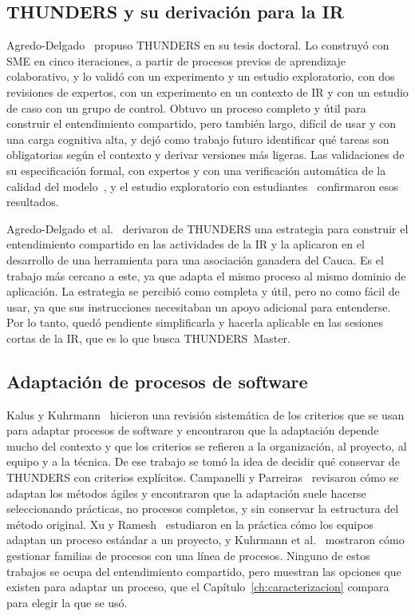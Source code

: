 \documentclass[12pt,letterpaper,oneside]{report}
\begin{document}
\subsection{THUNDERS y su derivación para la IR}
Agredo-Delgado~\cite{agredo2022thesis} propuso THUNDERS en su tesis doctoral. Lo
construyó con SME en cinco iteraciones, a partir de procesos previos de
aprendizaje colaborativo, y lo validó con un experimento y un estudio
exploratorio, con dos revisiones de expertos, con un experimento en un contexto
de IR y con un estudio de caso con un grupo de control. Obtuvo un proceso
completo y útil para construir el entendimiento compartido, pero también largo,
difícil de usar y con una carga cognitiva alta, y dejó como trabajo futuro
identificar qué tareas son obligatorias según el contexto y derivar versiones
más ligeras. Las validaciones de su especificación formal, con expertos y con
una verificación automática de la calidad del modelo~\cite{agredo2023validating},
y el estudio exploratorio con estudiantes~\cite{agredo2022exploratory}
confirmaron esos resultados.

Agredo-Delgado et al.~\cite{agredo2023strategy} derivaron de THUNDERS una
estrategia para construir el entendimiento compartido en las actividades de la
IR y la aplicaron en el desarrollo de una herramienta para una asociación
ganadera del Cauca. Es el trabajo más cercano a este, ya que adapta el mismo
proceso al mismo dominio de aplicación. La estrategia se percibió como completa
y útil, pero no como fácil de usar, ya que sus instrucciones necesitaban un apoyo
adicional para entenderse. Por lo tanto, quedó pendiente simplificarla y hacerla
aplicable en las sesiones cortas de la IR, que es lo que busca THUNDERS~Master.

\subsection{Adaptación de procesos de software}
Kalus y Kuhrmann~\cite{kalus2013tailoring} hicieron una revisión sistemática de
los criterios que se usan para adaptar procesos de software y encontraron que la
adaptación depende mucho del contexto y que los criterios se refieren a la
organización, al proyecto, al equipo y a la técnica. De ese trabajo se tomó la
idea de decidir qué conservar de THUNDERS con criterios explícitos. Campanelli y
Parreiras~\cite{campanelli2015agile} revisaron cómo se adaptan los métodos
ágiles y encontraron que la adaptación suele hacerse seleccionando prácticas, no
procesos completos, y sin conservar la estructura del método original. Xu y
Ramesh~\cite{xu2007} estudiaron en la práctica cómo los equipos adaptan un
proceso estándar a un proyecto, y Kuhrmann et al.~\cite{kuhrmann2016}
mostraron cómo gestionar familias de procesos con una línea de procesos. Ninguno
de estos trabajos se ocupa del entendimiento compartido, pero muestran las
opciones que existen para adaptar un proceso, que el Capítulo~\ref{ch:caracterizacion}
compara para elegir la que se usó.
\end{document}
